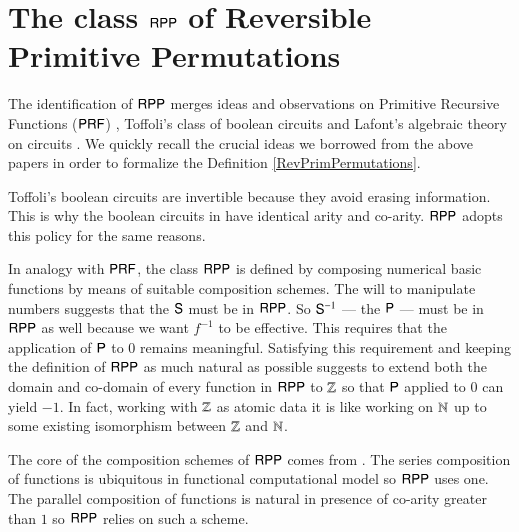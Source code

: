 \section{The class $ \mathsf{RPP} $ of Reversible Primitive Permutations}
\label{section:The class RPP of Reversible Primitive Permutations}

The identification of $ \mathsf{RPP} $ merges ideas and observations on Primitive Recursive Functions 
($ \mathsf{P}\mathsf{RF} $) \cite{peter1967book,malcev70book,matos03tcs,odifreddi1989book}, 
Toffoli's class of boolean circuits \cite{toffoli80lncs} and Lafont's 
algebraic theory on circuits \cite{Lafont2003257}. 
We quickly recall the crucial ideas we borrowed from the above papers in order to formalize the Definition \ref{RevPrimPermutations}.

Toffoli's  boolean circuits are invertible because they avoid erasing 
information. This is why the boolean circuits in \cite{toffoli80lncs} have
identical arity and co-arity. $\mathsf{RPP}$ adopts this policy for the same reasons.

In analogy with $ \mathsf{P}\mathsf{RF} $, the class $ \mathsf{RPP} $ is defined by composing 
numerical basic functions by means of suitable composition schemes. 
The will to manipulate numbers suggests that the \rprSuccName $ \mathsf{S} $ must be in $ \mathsf{RPP} $. 
So ${\mathsf{S}}^{-1}$ --- \ie the \rprPredName $ \mathsf{P} $ --- must be in $ \mathsf{RPP} $ as well because 
we want $ f^{-1} $ to be effective. This requires that the application of $ \mathsf{P}$ to $ 0 $ remains
meaningful. Satisfying this requirement and keeping the definition of $ \mathsf{RPP} $ as much natural as possible 
suggests to extend both the domain and co-domain of every function in $ \mathsf{RPP}$ to $ \mathbb{Z} $ so that 
$ \mathsf{P} $ applied to $ 0 $ can yield $ -1 $. 
In fact, working with $ \mathbb{Z} $ as atomic data
it is like working on $ \mathbb{N} $ up to some existing isomorphism between $ \mathbb{Z} $ and $ \mathbb{N} $.

The core of the composition schemes of $ \mathsf{RPP} $ comes from \cite{Lafont2003257}.
The series composition of functions is ubiquitous in functional computational model so $ \mathsf{RPP} $ uses one. 
The parallel composition of functions is natural in presence of co-arity greater than $ 1 $ so
$ \mathsf{RPP} $ relies on such a scheme.

